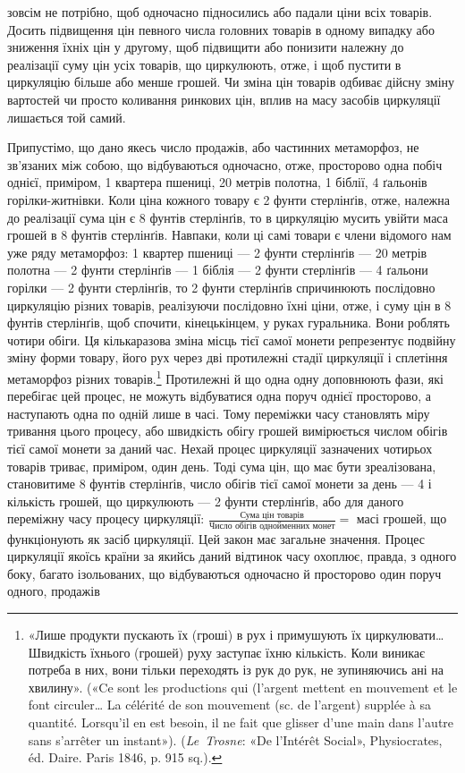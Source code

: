 \parcont{}  %
зовсім не потрібно, щоб одночасно підносились або падали ціни
всіх товарів. Досить підвищення цін певного числа головних
товарів в одному випадку або зниження їхніх цін у другому,
щоб підвищити або понизити належну до реалізації суму цін
усіх товарів, що циркулюють, отже, і щоб пустити в циркуляцію
більше або менше грошей. Чи зміна цін товарів одбиває дійсну
зміну вартостей чи просто коливання ринкових цін, вплив на
масу засобів циркуляції лишається той самий.

Припустімо, що дано якесь число продажів, або частинних
метаморфоз, не зв’язаних між собою, що відбуваються одночасно,
отже, просторово одна побіч однієї, приміром, 1 квартера пшениці,
20 метрів полотна, 1 біблії, 4 ґальонів горілки-житнівки. Коли
ціна кожного товару є 2 фунти стерлінґів, отже, належна до реалізації
сума цін є 8 фунтів стерлінґів, то в циркуляцію мусить
увійти маса грошей в 8 фунтів стерлінґів. Навпаки, коли ці самі
товари є члени відомого нам уже ряду метаморфоз: 1 квартер
пшениці — 2 фунти стерлінґів — 20 метрів полотна — 2 фунти
стерлінґів — 1 біблія — 2 фунти стерлінґів — 4 ґальони горілки —
2 фунти стерлінґів, то 2 фунти стерлінґів спричинюють послідовно
циркуляцію різних товарів, реалізуючи послідовно їхні
ціни, отже, і суму цін в 8 фунтів стерлінґів, щоб спочити, кінецькінцем,
у руках гуральника. Вони роблять чотири обіги. Ця
кількаразова зміна місць тієї самої монети репрезентує подвійну
зміну форми товару, його рух через дві протилежні стадії циркуляції
і сплетіння метаморфоз різних товарів.\footnote{
«Лише продукти пускають їх (гроші) в рух і примушують їх
циркулювати\dots{} Швидкість їхнього (грошей) руху заступає їхню кількість.
Коли виникає потреба в них, вони тільки переходять із рук до рук, не
зупиняючись ані на хвилину». («Ce sont les productions qui (l’argent
mettent en mouvement et le font circuler\dots{} La célérité de son mouvement
(sc. de l’argent) supplée à sa quantité. Lorsqu’il en est besoin, il ne fait
que glisser d’une main dans l’autre sans s’arrêter un instant»). (\emph{Le~Trosne}:
«De l’Intérêt Social», Physiocrates, éd. Daire. Paris 1846, p. 915 sq.).
} Протилежні й
що одна одну доповнюють фази, які перебігає цей процес, не можуть
відбуватися одна поруч однієї просторово, а наступають
одна по одній лише в часі. Тому переміжки часу становлять міру
тривання цього процесу, або швидкість обігу грошей вимірюється
числом обігів тієї самої монети за даний час. Нехай процес
циркуляції зазначених чотирьох товарів триває, приміром, один
день. Тоді сума цін, що має бути зреалізована, становитиме
8 фунтів стерлінґів, число обігів тієї самої монети за день — 4
і кількість грошей, що циркулюють — 2 фунти стерлінґів, або
для даного переміжну часу процесу циркуляції:
$\frac{\text{Сума цін товарів}}{\text{Число обігів однойменних монет}} =$
масі грошей, що функціонують
як засіб циркуляції. Цей закон має загальне значення.
Процес циркуляції якоїсь країни за якийсь даний відтинок часу
охоплює, правда, з одного боку, багато ізольованих, що відбуваються
одночасно й просторово один поруч одного, продажів
\parbreak{}  %
